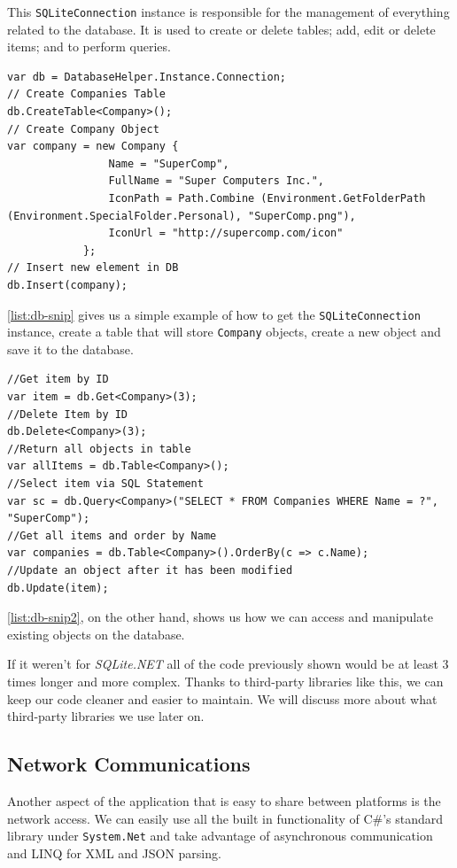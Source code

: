 This \texttt{SQLiteConnection} instance is responsible for the management of everything related to the database. It is used to create or delete tables; add, edit or delete items; and to perform queries.

\begin{lstlisting}[frame=lt,caption=DB Snippet, label={list:db-snip}]
var db = DatabaseHelper.Instance.Connection;
// Create Companies Table
db.CreateTable<Company>();
// Create Company Object
var company = new Company {
                Name = "SuperComp",
                FullName = "Super Computers Inc.",
                IconPath = Path.Combine (Environment.GetFolderPath (Environment.SpecialFolder.Personal), "SuperComp.png"),
                IconUrl = "http://supercomp.com/icon"
            };
// Insert new element in DB
db.Insert(company);    
\end{lstlisting}

\autoref{list:db-snip} gives us a simple example of how to get the \texttt{SQLiteConnection} instance, create a table that will store \texttt{Company} objects, create a new object and save it to the database.

\begin{lstlisting}[frame=lt,caption=DB Snippet 2, label={list:db-snip2}]
//Get item by ID
var item = db.Get<Company>(3);
//Delete Item by ID
db.Delete<Company>(3);
//Return all objects in table
var allItems = db.Table<Company>();
//Select item via SQL Statement
var sc = db.Query<Company>("SELECT * FROM Companies WHERE Name = ?", "SuperComp");
//Get all items and order by Name
var companies = db.Table<Company>().OrderBy(c => c.Name);
//Update an object after it has been modified
db.Update(item);
\end{lstlisting}

\autoref{list:db-snip2}, on the other hand, shows us how we can access and manipulate existing objects on the database.

If it weren't for \textit{SQLite.NET} all of the code previously shown would be at least 3 times longer and more complex. Thanks to third-party libraries like this, we can keep our code cleaner and easier to maintain. We will discuss more about what third-party libraries we use later on.   

\subsection{Network Communications}
Another aspect of the application that is easy to share between platforms is the network access. We can easily use all the built in functionality of C\#'s standard library under \texttt{System.Net} and take advantage of asynchronous communication and \ac{LINQ} for \ac{XML} and \ac{JSON} parsing.

